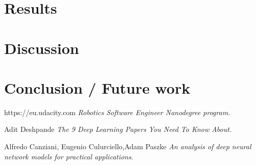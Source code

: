 \documentclass[10pt,journal,compsoc]{IEEEtran}
\begin{document}
\section{Results}
\section{Discussion}
\section{Conclusion / Future work}

\begin{thebibliography}{9}


https://eu.udacity.com
\textit{Robotics Software Engineer Nanodegree program}. 

Adit Deshpande
\textit{The 9 Deep Learning Papers You Need To Know About}. 

Alfredo Canziani, Eugenio Culurciello,Adam Paszke  
\textit{An analysis of deep neural network models for practical applications}. 
\end{thebibliography}
\end{document}
